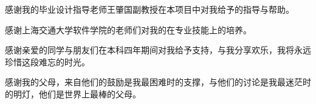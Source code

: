 \begin{thanks}

感谢我的毕业设计指导老师王肇国副教授在本项目中对我给予的指导与帮助。

感谢上海交通大学软件学院的老师们对我的在专业技能上的培养。

感谢亲爱的同学与朋友们在本科四年期间对我给予支持，与我分享欢乐，我将永远珍惜这段难忘的时光。

感谢我的父母，来自他们的鼓励是我最困难时的支撑，与他们的讨论是我最迷茫时的明灯，他们是世界上最棒的父母。

\end{thanks}
